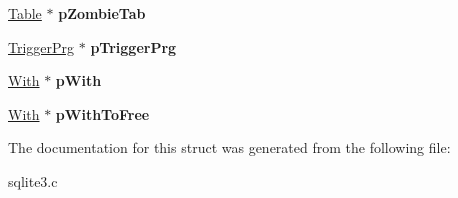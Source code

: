 \begin{DoxyCompactItemize}
\item 
\hyperlink{structTable}{Table} $\ast$ {\bfseries p\+Zombie\+Tab}\hypertarget{structParse_a4e8319f0a7f0d21e472c13ac6cf67060}{}\label{structParse_a4e8319f0a7f0d21e472c13ac6cf67060}

\item 
\hyperlink{structTriggerPrg}{Trigger\+Prg} $\ast$ {\bfseries p\+Trigger\+Prg}\hypertarget{structParse_a0891dbd3b583594c5d07d7b061026ea4}{}\label{structParse_a0891dbd3b583594c5d07d7b061026ea4}

\item 
\hyperlink{structWith}{With} $\ast$ {\bfseries p\+With}\hypertarget{structParse_a7a812b036ddcc4b838b956328e1ff03e}{}\label{structParse_a7a812b036ddcc4b838b956328e1ff03e}

\item 
\hyperlink{structWith}{With} $\ast$ {\bfseries p\+With\+To\+Free}\hypertarget{structParse_ae8e4463fa9d87da2833a542e27dd722d}{}\label{structParse_ae8e4463fa9d87da2833a542e27dd722d}

\end{DoxyCompactItemize}


The documentation for this struct was generated from the following file\+:\begin{DoxyCompactItemize}
\item 
sqlite3.\+c\end{DoxyCompactItemize}
